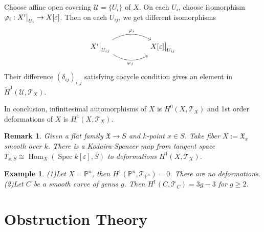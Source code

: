\documentclass{ctexart}
\newtheorem{remark}{Remark}[section]
\newtheorem{example}{Example}[section]
\renewcommand{\hom}{\operatorname{Hom}}
\newcommand{\spec}{\operatorname{Spec}}
\begin{document}
Choose affine open covering $\mathcal{U} = \{U_{i}\}$ of $X$.
On each $U_{i}$, choose isomorphism $\varphi_{i}: X'\big{|}_{U_{i}} \rightarrow X[\varepsilon]$.
Then on each $U_{ij}$, we get different isomorphisms
\begin{equation}
    \begin{tikzcd}[row sep = huge]
        X'\big{|}_{U_{ij}} \arrow[rr, "\varphi_{j}" swap, bend right] \arrow[rr, "\varphi_{i}", bend left] &&
        X[\varepsilon]\big{|}_{U_{ij}} 
    \end{tikzcd}
\end{equation}
Their difference $(\delta_{ij})_{i, j}$ satisfying cocycle condition gives an element in $\check{H}^{1}(\mathcal{U}, \mathcal{T}_{X})$.
\par
In conclusion, infinitesimal automorphisms of $X$ is $H^{0}(X, \mathcal{T}_{X})$ and 1st order deformations of $X$ is $H^{1}(X, \mathcal{T}_{X})$.
\begin{remark}
    Given a flat family $\mathfrak{X} \longrightarrow S$ and $k$-point $x\in S$.
    Take fiber $X := \mathfrak{X}_{x}$ smooth over $k$.
    There is a Kodaira-Spencer map from tangent space $T_{x, S} \cong \hom_{X}(\spec k[\varepsilon], S)$ to deformations $H^{1}(X, \mathcal{T}_{X})$.
\end{remark}
\begin{example}
    (1)Let $X = \mathbb{P}^{n}$, then $H^{1}(\mathbb{P}^{n}, \mathcal{T}_{\mathbb{P}^{n}}) = 0$.
    There are no deformations. \\
    (2)Let $C$ be a smooth curve of genus $g$.
    Then $H^{1}(C, \mathcal{T}_{C}) = 3g - 3$ for $g \ge 2$.
\end{example}

\section{Obstruction Theory}
\label{section:Obstruction_Theory}
\end{document}
